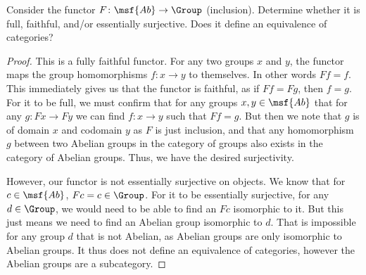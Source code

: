 \documentclass[main.tex]{subfiles}
\begin{document}
%

\begin{exercise}
	Consider the functor $F\colon\msf{ Ab} \rightarrow \Group$ (inclusion).  Determine whether it is full, faithful, and/or essentially surjective.  Does it define an equivalence of categories?
\end{exercise}

\begin{proof}
	This is a fully faithful functor. For any two groups $x$ and $y$, the functor maps the group homomorphisms $f\colon x \rightarrow y$ to themselves.  In other words $Ff = f$.  This immediately gives us that the functor is faithful, as if $Ff = Fg$, then $f = g$.  
For it to be full, we must confirm that for any groups $x,y \in \msf{Ab}$ that for any $g\colon Fx \rightarrow Fy$ we can find $f\colon x \rightarrow y$ such that $Ff = g$.  But then we note that $g$ is of domain $x$ and codomain $y$ as $F$ is just inclusion, and that any homomorphism $g$ between two Abelian groups in the category of groups
also exists in the category of Abelian groups.  Thus, we have the desired surjectivity.


However, our functor is not essentially surjective on objects.  We know that 
for $c \in \msf{Ab}$, $Fc = c \in \Group$.  For it to be essentially surjective, 
for any $d \in \Group$, we would need to be able to find an $Fc$ isomorphic to 
it.  But this just means we need to find an Abelian group isomorphic to $d$.  
That is impossible for any group $d$ that is not Abelian, as Abelian groups are 
only isomorphic to Abelian groups. It thus does not define an equivalence of 
categories, however the Abelian groups are a subcategory. 
\end{proof}
\end{document}
